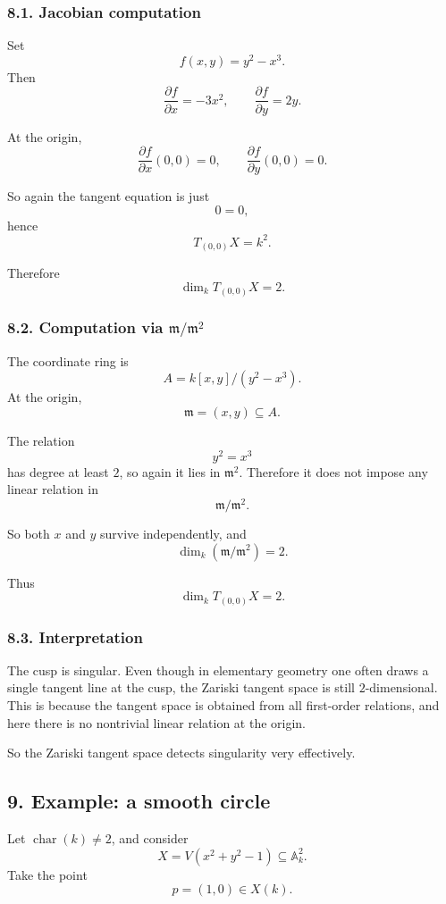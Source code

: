 \documentclass[12pt,a4paper]{article}
\theoremstyle{plain}
\theoremstyle{definition}      %
\begin{document}
	\subsubsection*{8.1. Jacobian computation}
	
	Set
	\[
	f(x,y)=y^2-x^3.
	\]
	Then
	\[
	\frac{\partial f}{\partial x}=-3x^2,
	\qquad
	\frac{\partial f}{\partial y}=2y.
	\]
	
	At the origin,
	\[
	\frac{\partial f}{\partial x}(0,0)=0,
	\qquad
	\frac{\partial f}{\partial y}(0,0)=0.
	\]
	
	So again the tangent equation is just
	\[
	0=0,
	\]
	hence
	\[
	T_{(0,0)}X=k^2.
	\]
	
	Therefore
	\[
	\dim_k T_{(0,0)}X=2.
	\]
	
	\subsubsection*{8.2. Computation via \(\mathfrak m/\mathfrak m^2\)}
	
	The coordinate ring is
	\[
	A=k[x,y]/(y^2-x^3).
	\]
	At the origin,
	\[
	\mathfrak m=(x,y)\subseteq A.
	\]
	
	The relation
	\[
	y^2=x^3
	\]
	has degree at least \(2\), so again it lies in \(\mathfrak m^2\). Therefore it does not impose any linear relation in
	\[
	\mathfrak m/\mathfrak m^2.
	\]
	
	So both \(x\) and \(y\) survive independently, and
	\[
	\dim_k(\mathfrak m/\mathfrak m^2)=2.
	\]
	
	Thus
	\[
	\dim_k T_{(0,0)}X=2.
	\]
	
	\subsubsection*{8.3. Interpretation}
	
	The cusp is singular. Even though in elementary geometry one often draws a single tangent line at the cusp, the Zariski tangent space is still \(2\)-dimensional. This is because the tangent space is obtained from all first-order relations, and here there is no nontrivial linear relation at the origin.
	
	So the Zariski tangent space detects singularity very effectively.
	
	\subsection*{9. Example: a smooth circle}
	
	Let \(\operatorname{char}(k)\neq 2\), and consider
	\[
	X=V(x^2+y^2-1)\subseteq \mathbb A_k^2.
	\]
	Take the point
	\[
	p=(1,0)\in X(k).
	\]
	
\end{document}
